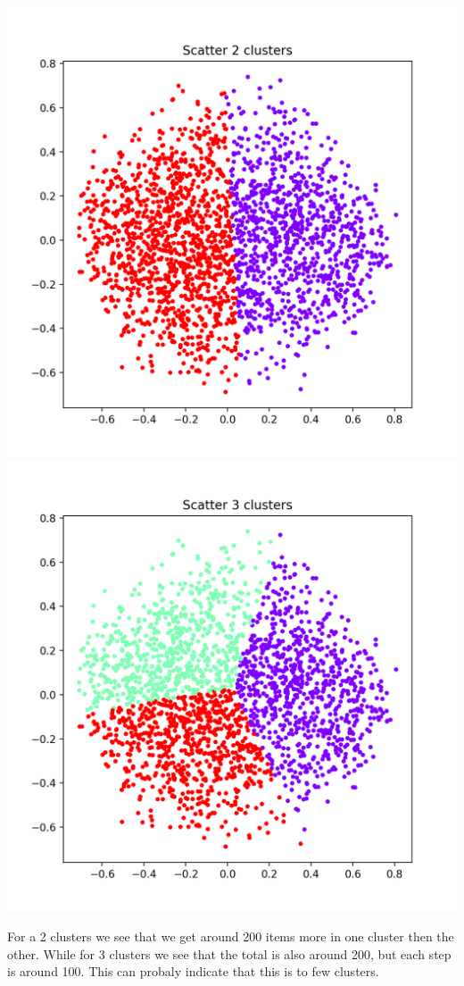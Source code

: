 \documentclass[10pt]{article}
\begin{document}
    \includegraphics[scale=0.35]{scatter_2.png}
    \includegraphics[scale=0.35]{scatter_3.png}

    For a 2 clusters we see that we get around 200 items more in one cluster then the other. While for 3 clusters we see that the total is also around 200, but each step is around 100. This can probaly indicate that this is to few clusters.
    
\end{document}
